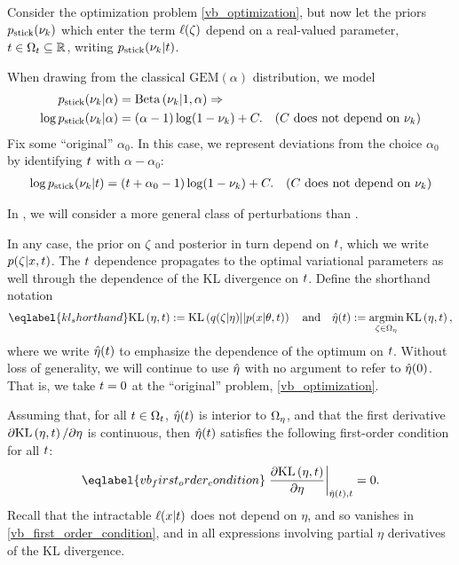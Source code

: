 Consider the optimization problem \eqref{vb_optimization}, but now let the
priors $p_{\mathrm{stick}}(\nu_{k})$ which enter the term $\ell(\zeta)$ depend on a
real-valued parameter, $t \in \Omega_{t} \subseteq \mathbb{R}$, writing
$p_{\mathrm{stick}}(\nu_{k} \vert t)$.

\begin{ex}
%
When drawing from the classical $\mathrm{GEM}(\alpha)$ distribution, we
model
%
\begin{align*}
%
\pstick(\nuk \vert \alpha) ={}&
    \betadist{\nuk \vert 1, \alpha} \Rightarrow\\
\log \pstick(\nuk \vert \alpha) ={}&
    (\alpha - 1) \log(1 - \nuk) + \const. &
    \constdesc{\nuk}
%
\end{align*}
%
Fix some ``original'' $\alpha_0$.  In this case, we represent deviations from the
choice $\alpha_0$ by identifying $t$ with $\alpha - \alpha_0$:
%
\begin{align*}
%
\log \pstick(\nuk \vert \t) ={}&
    (\t + \alpha_0 - 1) \log(1 - \nuk) + \const. &
    \constdesc{\nuk}
%
\end{align*}
%
\end{ex}

In , we will consider a more general class of
perturbations than .

In any case, the prior on $\zeta$ and posterior in turn depend on $t$, which we
write $p(\zeta \vert x, t)$. The $t$ dependence propagates to the optimal
variational parameters as well through the dependence of the KL divergence on
$t$.  Define the shorthand notation
%
\begin{align}\eqlabel{kl_shorthand}
%
\KL{\eta, \t} := \KL{\q(\zeta \vert \eta) || p(\x \vert \theta, \t)}
\mathand
\etaopt(\t) := \argmin_{\zeta \in \etadom} \KL{\eta, \t},
%
\end{align}
%
where we write $\hat\eta(t)$ to emphasize the dependence of the optimum on $t$.
Without loss of generality, we will continue to use $\hat\eta$ with no argument
to refer to $\hat\eta(0)$.  That is, we take $t = 0$ at the ``original''
problem, \eqref{vb_optimization}.

Assuming that, for all $t \in \Omega_{t}$, $\hat\eta(t)$ is interior to $\Omega_{\eta}$,
and that the first derivative $\partial \mathrm{KL}\left(\eta, t\right)/ \partial \eta$ is
continuous, then $\hat\eta(t)$ satisfies the following first-order condition for
all $t$:
%
\begin{align}\eqlabel{vb_first_order_condition}
%
\fracat{\partial \KL{\eta, \t}}{ \partial \eta}{\etaopt(\t), \t} = 0.
%
\end{align}
%
Recall that the intractable $\ell(x \vert t)$ does not depend on $\eta$, and
so vanishes in \eqref{vb_first_order_condition}, and in all expressions
involving partial $\eta$ derivatives of the KL divergence.

